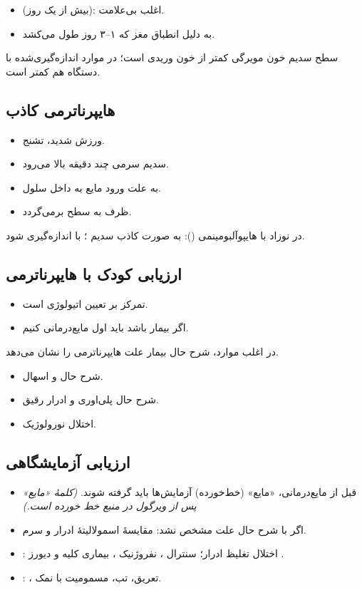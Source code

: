 \documentclass[12pt,a4paper]{article}
\begin{document}
\begin{itemize}
\item {} (بیش از یک روز): اغلب بی‌علامت.
\item به دلیل انطباق مغز که ۱–۳ روز طول می‌کشد.
\end{itemize}
سطح سدیم خون مویرگی  کمتر از خون وریدی است؛ در موارد اندازه‌گیری‌شده با دستگاه  هم کمتر است.
\subsection*{هایپرناترمی کاذب}
\begin{itemize}
\item ورزش شدید، تشنج.
\item سدیم سرمی چند دقیقه  بالا می‌رود.
\item به علت ورود مایع به داخل سلول.
\item ظرف  به سطح  برمی‌گردد.
\end{itemize}
در نوزاد  با هایپوآلبومینمی (): به صورت کاذب سدیم ؛ با  اندازه‌گیری شود.
\subsection*{ارزیابی کودک با هایپرناترمی}
\begin{itemize}
\item تمرکز بر تعیین اتیولوژی است.
\item اگر بیمار  باشد باید اول مایع‌درمانی کنیم.
\end{itemize}
در اغلب موارد، شرح حال بیمار علت هایپرناترمی را نشان می‌دهد.

\begin{itemize}
\item شرح حال  و اسهال.
\item شرح حال پلی‌اوری و ادرار رقیق.
\item اختلال نورولوژیک.
\end{itemize}
\subsection*{ارزیابی آزمایشگاهی}
\begin{itemize}
\item قبل از مایع‌درمانی، «مایع» (خط‌خورده) آزمایش‌ها باید گرفته شوند. \textit{(کلمهٔ «مایع» پس از ویرگول در منبع خط خورده است.)}
\item اگر با شرح حال علت مشخص نشد: مقایسهٔ اسمولالیتهٔ ادرار و سرم.
\item {}: اختلال تغلیظ ادرار؛ سنترال ، نفروژنیک ، بیماری کلیه و دیورز .
\item {}: ، تعریق، تب، مسمومیت با نمک.
\end{itemize}
\end{document}
